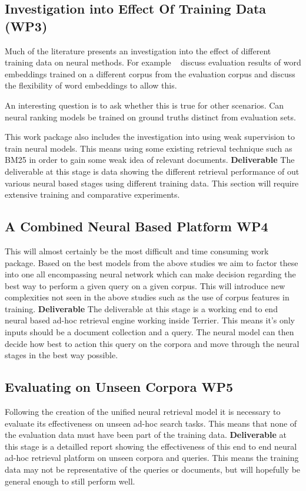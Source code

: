 \documentclass[11pt,english,twocolumn]{article}
\let\oldcite=\cite
\renewcommand\cite[1]{\ifthenelse{\equal{#1}{NEEDED}}{\ensuremath{^\texttt{[citation~needed]}}}{\oldcite{#1}}}
\begin{document}
\subsection{Investigation into Effect Of Training Data (\textbf{WP3})}
Much of the literature presents an investigation into the effect of different training data on neural methods. For example ~\cite{} discuss evaluation results of word embeddings trained on a different corpus from the evaluation corpus and discuss the flexibility of word embeddings to allow this.

An interesting question is to ask whether this is true for other scenarios. Can neural ranking models be trained on ground truths distinct from evaluation sets.

This work package also includes the investigation into using weak supervision to train neural models. This means using some existing retrieval technique such as BM25 in order to gain some weak idea of relevant documents.
\textbf{Deliverable}
The deliverable at this stage is data showing the different retrieval performance of out various neural based stages using different training data. This section will require extensive training and comparative experiments.

\subsection{A Combined Neural Based Platform \textbf{WP4}}
This will almost certainly be the most difficult and time consuming work package. Based on the best models from the above studies we aim to factor these into one all encompassing neural network which can make decision regarding the best way to perform a given query on a given corpus.
This will introduce new complexities not seen in the above studies such as the use of corpus features in training.
\textbf{Deliverable} The deliverable at this stage is a working end to end neural based ad-hoc retrieval engine working inside Terrier. This means it's only inputs should be a document collection and a query. The neural model can then decide how best to action this query on the corpora and move through the neural stages in the best way possible.

\subsection{Evaluating on Unseen Corpora \textbf{WP5}}
Following the creation of the unified neural retrieval model it is necessary to evaluate its effectiveness on unseen ad-hoc search tasks. This means that none of the evaluation data must have been part of the training data. \textbf{Deliverable} at this stage is a detailled report showing the effectiveness of this end to end neural ad-hoc retrieval platform on unseen corpora and queries. This means the training data may not be representative of the queries or documents, but will hopefully be general enough to still perform well.
\end{document}
